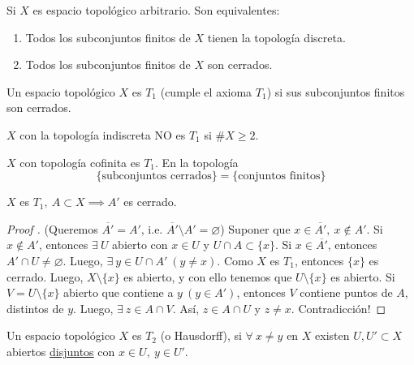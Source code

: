 	\begin{lemma}
		Si $X$ es espacio topológico arbitrario. Son equivalentes:
		\begin{enumerate}
			\item Todos los subconjuntos finitos de $X$ tienen la topología discreta.

			\item Todos los subconjuntos finitos de $X$ son cerrados.
		\end{enumerate}
	\end{lemma}

	\begin{definition}
		Un espacio topológico $X$ es $T_1$ (cumple el axioma $T_1$) si sus subconjuntos finitos son cerrados.
	\end{definition}

	\begin{eg}
		$X$ con la topología indiscreta NO es $T_1$ si $\# X \geq 2$.
	\end{eg}

	\begin{eg}
		$X$ con topología cofinita es $T_1$. En la topología
		\[
		\{ \text{subconjuntos cerrados} \} = \{ \text{conjuntos finitos} \}
		\]
	\end{eg}

	\begin{lemma}
		$X$ es $T_1,\ A \subset X \implies A'$ es cerrado.
	\end{lemma}

	\begin{proof}[Proof ]
		(Queremos $\overline{A'} = A'$, i.e. $\overline{A'} \setminus A' = \varnothing$) Suponer que $x \in \overline{A'},\ x \not\in A'$. Si $x \not\in A'$, entonces $\exists\ U$ abierto con $x\in U$ y $U\cap A \subset \{x\}$. Si $x \in \overline{A'}$, entonces $A'\cap U \neq \varnothing$. Luego, $\exists\ y \in U \cap A' \ (y\neq x)$. Como $X$ es $T_1$, entonces $\{x\}$ es cerrado. Luego, $X \setminus \{x\}$ es abierto, y con ello tenemos que $U \setminus \{x\}$ es abierto. Si $V = U \setminus \{x\}$ abierto que contiene a $y \ (y\in A')$, entonces $V$ contiene puntos de $A$, distintos de $y$. Luego, $\exists\ z \in A \cap V$. Así, $z \in A \cap U$ y $z \neq x$. Contradicción! \textreferencemark
	\end{proof}

	\begin{definition}
		Un espacio topológico $X$ es $T_2$ (o Hausdorff), si $\forall \ x \neq y$ en $X$ existen $U,U' \subset X$ abiertos \underline{disjuntos} con $x \in U,\ y \in U'$.
	\end{definition}

